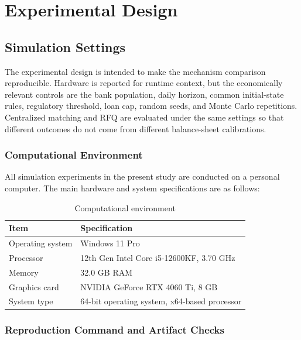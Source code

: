 \chapter{Experimental Design}

\section{Simulation Settings}

The experimental design is intended to make the mechanism comparison
reproducible. Hardware is reported for runtime context, but the
economically relevant controls are the bank population, daily horizon,
common initial-state rules, regulatory threshold, loan cap, random
seeds, and Monte Carlo repetitions. Centralized matching and RFQ are
evaluated under the same settings so that different outcomes do not come
from different balance-sheet calibrations.

\subsection{Computational Environment}

All simulation experiments in the present study are conducted on a
personal computer. The main hardware and system specifications are as
follows:


\begin{table}[htbp]
\centering
\caption{Computational environment}
\label{tab:computational-environment}
\small
\renewcommand{\arraystretch}{1.15}
\begin{tabularx}{0.92\textwidth}{@{}>{\raggedright\arraybackslash}p{}X@{}}
\toprule
\textbf{Item} & \textbf{Specification}\\
\midrule
Operating system & Windows 11 Pro\\
Processor & 12th Gen Intel Core i5-12600KF, 3.70 GHz\\
Memory & 32.0 GB RAM\\
Graphics card & NVIDIA GeForce RTX 4060 Ti, 8 GB\\
System type & 64-bit operating system, x64-based processor\\
\bottomrule
\end{tabularx}
\end{table}

\subsection{Reproduction Command and Artifact Checks}

